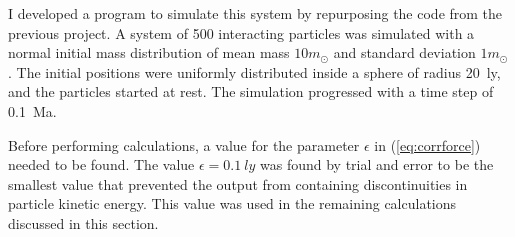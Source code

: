 \documentclass[aps,prc,reprint,floatfix,nobalancelastpage]{revtex4-1}
\newcommand{\sun}[0]{\ensuremath{\odot}}
\begin{document}
    I developed a program to simulate this system by repurposing the code from the previous project. \cite{Bradt2016} A system of 500 interacting particles was simulated with a normal initial mass distribution of mean mass $10 m_\sun$ and standard deviation $1 m_\sun$. The initial positions were uniformly distributed inside a sphere of radius \SI{20}{ly}, and the particles started at rest. The simulation progressed with a time step of \SI{0.1}{Ma}.

    Before performing calculations, a value for the parameter $\epsilon$ in (\ref{eq:corrforce}) needed to be found. The value $\epsilon = \SI{0.1}{ly}$ was found by trial and error to be the smallest value that prevented the output from containing discontinuities in particle kinetic energy. This value was used in the remaining calculations discussed in this section.
\end{document}
